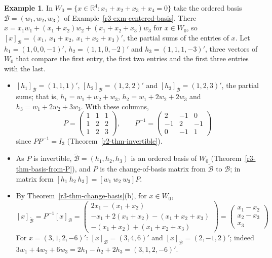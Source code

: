 \documentclass[12pt]{article}
\newcommand{\R}{\mathbb R}
\theoremstyle{definition}
\newtheorem{example}[theorem]{Example}
\begin{document}
\begin{example}\label{r3-exm-contrasts}
In \(W_0=\{x\in\R^4:x_1+x_2+x_3+x_4=0\}\) take the ordered basis \(\mathcal B=(w_1,w_2,w_3)\) of
Example~\ref{r3-exm-centered-basis}. There \(x=x_1w_1+(x_1+x_2)w_2+(x_1+x_2+x_3)w_3\) for \(x\in W_0\), so
\([x]_{\mathcal B}=(x_1,\ x_1+x_2,\ x_1+x_2+x_3)'\), the partial sums of the entries of \(x\). Let
\(h_1=(1,0,0,-1)'\), \(h_2=(1,1,0,-2)'\) and \(h_3=(1,1,1,-3)'\), three vectors of \(W_0\) that compare the first
entry, the first two entries and the first three entries with the last.
\begin{itemize}
\item \([h_1]_{\mathcal B}=(1,1,1)'\), \([h_2]_{\mathcal B}=(1,2,2)'\) and \([h_3]_{\mathcal B}=(1,2,3)'\), the
partial sums; that is, \(h_1=w_1+w_2+w_3\), \(h_2=w_1+2w_2+2w_3\) and \(h_3=w_1+2w_2+3w_3\). With these columns,
\[
P=\begin{pmatrix}1&1&1\\1&2&2\\1&2&3\end{pmatrix},\qquad P^{-1}=\begin{pmatrix}2&-1&0\\-1&2&-1\\0&-1&1\end{pmatrix}
\]
since \(PP^{-1}=I_3\) (Theorem~\ref{r2-thm-invertible}).
\item As \(P\) is invertible, \(\tilde{\mathcal B}=(h_1,h_2,h_3)\) is an ordered basis of \(W_0\)
(Theorem~\ref{r3-thm-basis-from-P}), and \(P\) is the change-of-basis matrix from \(\tilde{\mathcal B}\)
to \(\mathcal B\); in matrix form \([h_1\ h_2\ h_3]=[w_1\ w_2\ w_3]P\).
\item By Theorem~\ref{r3-thm-change-basis}(b), for \(x\in W_0\),
\[
[x]_{\tilde{\mathcal B}}=P^{-1}[x]_{\mathcal B}
=\begin{pmatrix}2x_1-(x_1+x_2)\\-x_1+2(x_1+x_2)-(x_1+x_2+x_3)\\-(x_1+x_2)+(x_1+x_2+x_3)\end{pmatrix}
=\begin{pmatrix}x_1-x_2\\x_2-x_3\\x_3\end{pmatrix}
\]
For \(x=(3,1,2,-6)'\): \([x]_{\mathcal B}=(3,4,6)'\) and \([x]_{\tilde{\mathcal B}}=(2,-1,2)'\); indeed
\(3w_1+4w_2+6w_3=2h_1-h_2+2h_3=(3,1,2,-6)'\).
\end{itemize}
\end{example}
\end{document}
